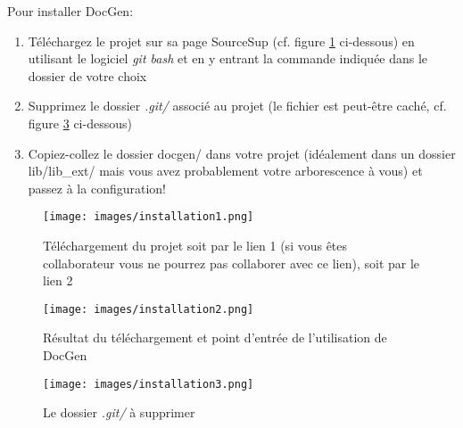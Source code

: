 \documentclass[./standalone.tex]{subfiles}
\begin{document}
Pour installer DocGen:
\begin{enumerate}
    \item Téléchargez le projet sur sa page SourceSup (cf. figure     \ref{fig:installation1} ci-dessous) en utilisant le logiciel \textit{git bash} et en y entrant la commande indiquée dans le dossier de votre choix
    \item Supprimez le dossier \textit{.git/} associé au projet (le fichier est peut-être caché, cf. figure \ref{fig:installation3} ci-dessous)
    \item Copiez-collez le dossier docgen/ dans votre projet (idéalement dans un dossier lib/lib\_ext/ mais vous avez probablement votre arborescence à vous) et passez à la configuration!\\
\end{enumerate}
\vspace{1cm}

\begin{figure}[h!]
    \centering
    \texttt{[image: images/installation1.png]}
    \caption{Téléchargement du projet soit par le lien 1 (si vous êtes collaborateur vous ne pourrez pas collaborer avec ce lien), soit par le lien 2}
    \label{fig:installation1}
\end{figure}
\vspace{1cm}

\begin{figure}[h!]
    \centering
    \texttt{[image: images/installation2.png]}
    \caption{Résultat du téléchargement et point d'entrée de l'utilisation de DocGen}
    \label{fig:installation2}
\end{figure}
\vspace{1cm}

\begin{figure}[h!]
    \centering
    \texttt{[image: images/installation3.png]}
    \caption{Le dossier \textit{.git/} à supprimer}
    \label{fig:installation3}
\end{figure}
\end{document}
